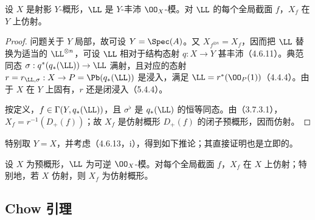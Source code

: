 设 $X$ 是射影 $Y$-概形，$\LL$ 是 $Y$-丰沛 $\OO_X$-模。对 $\LL$ 的每个全局截面 $f$，$X_f$ 在 $Y$ 上仿射。
\begin{proof}
问题关于 $Y$ 局部，故可设 $Y=\Spec(A)$。又 $X_{f^{\otimes n}}=X_f$，因而把 $\LL$ 替换为适当的 $\LL^{\otimes n}$，可设 $\LL$ 相对于结构态射 $q:X\to Y$ 甚丰沛（4.6.11）。典范同态
$\sigma:q^*(q_*(\LL))\to\LL$ 满射，且对应的态射
$r=r_{\LL,\sigma}:X\to P=\Pb(q_*(\LL))$ 是浸入，满足 $\LL=r^*(\OO_P(1))$（4.4.4）。由于 $X$ 在 $Y$ 上固有，$r$ 还是闭浸入（5.4.4）。

按定义，$f\in\Gamma(Y,q_*(\LL))$，且 $\sigma^\flat$ 是 $q_*(\LL)$ 的恒等同态。由（3.7.3.1），$X_f=r^{-1}(D_+(f))$；故 $X_f$ 是仿射概形 $D_+(f)$ 的闭子预概形，因而仿射。
\end{proof}
特别取 $Y=X$，并考虑（4.6.13，i），得到如下推论；其直接证明也是立即的。

设 $X$ 为预概形，$\LL$ 为可逆 $\OO_X$-模。对每个全局截面 $f$，$X_f$ 在 $X$ 上仿射；特别地，若 $X$ 仿射，则 $X_f$ 为仿射概形。

\subsection{Chow 引理}

